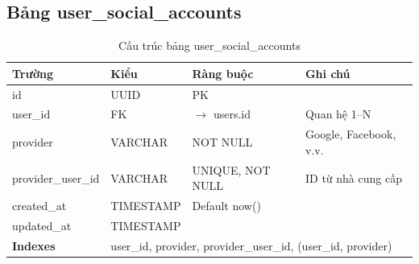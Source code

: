 \documentclass[12pt,a4paper]{article}
\begin{document}
\subsection{Bảng user\_social\_accounts}
\begin{longtable}{|l|l|l|p{5.5cm}|}
    \caption{Cấu trúc bảng user\_social\_accounts}                                                                                                           \\
    \hline
    \rowcolor{headerblue}
    \textbf{Trường}    & \textbf{Kiểu}                                                                     & \textbf{Ràng buộc}     & \textbf{Ghi chú}       \\
    \hline
    id                 & UUID                                                                              & PK                     &                        \\
    \hline
    user\_id           & FK                                                                                & $\rightarrow$ users.id & Quan hệ 1--N           \\
    \hline
    provider           & VARCHAR                                                                           & NOT NULL               & Google, Facebook, v.v. \\
    \hline
    provider\_user\_id & VARCHAR                                                                           & UNIQUE, NOT NULL       & ID từ nhà cung cấp     \\
    \hline
    created\_at        & TIMESTAMP                                                                         & Default now()          &                        \\
    \hline
    updated\_at        & TIMESTAMP                                                                         &                        &                        \\
    \hline
    \rowcolor{headerblue}
    \textbf{Indexes}   & \multicolumn{3}{l|}{user\_id, provider, provider\_user\_id, (user\_id, provider)}                                                   \\
    \hline
\end{longtable}
\end{document}
